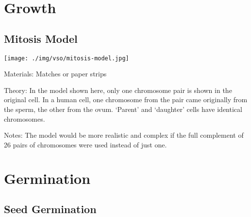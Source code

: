 \section{Growth}

\begin{multicols}{2}


\subsection{Mitosis Model} %

\begin{center}
\texttt{[image: ./img/vso/mitosis-model.jpg]}
\end{center}

\begin{description*}
\item[Materials:]{Matches or paper strips}
\item[Theory:]{In the model shown here, only
one chromosome pair is shown in
the original cell. In a human cell,
one chromosome from the pair
came originally from the sperm,
the other from the ovum. `Parent'
and `daughter' cells have identical
chromosomes.}
\item[Notes:]{The model would be more
realistic and complex if the full
complement of 26 pairs of
chromosomes were used instead
of just one.}
\end{description*}


\section*{Germination}


\subsection{Seed Germination} %



\end{multicols}

